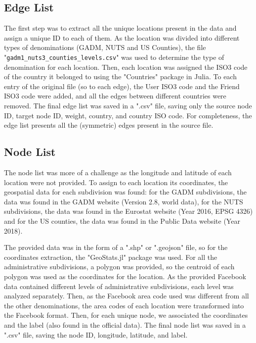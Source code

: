 \subsection{Edge List}
The first step was to extract all the unique locations present in the data and assign a unique ID to each of them. As the location was divided into different types of denominations (GADM\cite{GADM}, NUTS\cite{NUTS} and US Counties), the file "\texttt{gadm1\_nuts3\_counties\_levels.csv}" was used to determine the type of denomination for each location.
Then, each location was assigned the ISO3 code of the country it belonged to using the "Countries" package in Julia\cite{countries_package}.
To each entry of the original file (so to each edge), the User ISO3 code and the Friend ISO3 code were added, and all the edges between different countries were removed.
The final edge list was saved in a ".csv" file, saving only the source node ID, target node ID, weight, country, and country ISO code.
For completeness, the edge list presents all the (symmetric) edges present in the source file.

\subsection{Node List}
The node list was more of a challenge as the longitude and latitude of each location were not provided.
To assign to each location its coordinates, the geospatial data for each subdivision was found: for the GADM subdivisions, the data was found in the GADM website\cite{GADM} (Version 2.8, world data), for the NUTS subdivisions, the data was found in the Eurostat website\cite{NUTS} (Year 2016, EPSG 4326) and for the US counties, the data was found in the Public Data website\cite{USCounties} (Year 2018).

The provided data was in the form of a ".shp" or ".geojson" file, so for the coordinates extraction, the "GeoStats.jl" package was used\cite{geostats_package}. For all the administrative subdivisions, a polygon was provided, so the centroid of each polygon was used as the coordinates for the location. As the provided Facebook data contained different levels of administrative subdivisions, each level was analyzed separately.
Then, as the Facebook area code used was different from all the other denominations, the area codes of each location were transformed into the Facebook format.
Then, for each unique node, we associated the coordinates and the label (also found in the official data).
The final node list was saved in a ".csv" file, saving the node ID, longitude, latitude, and label.

